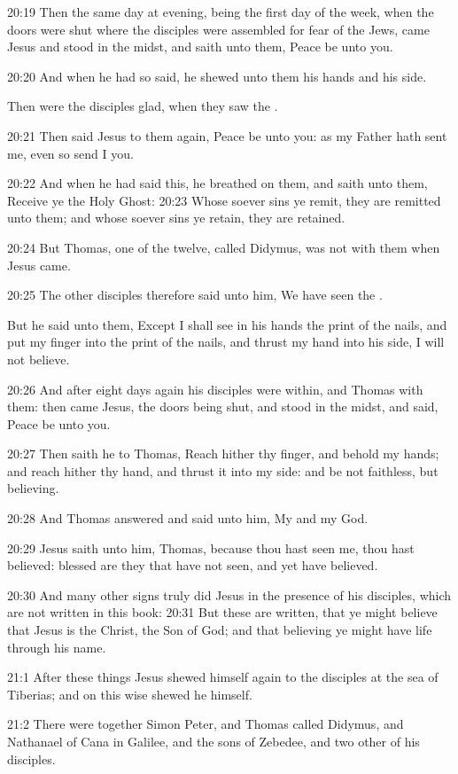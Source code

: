 20:19 Then the same day at evening, being the first day of the week,
when the doors were shut where the disciples were assembled for fear
of the Jews, came Jesus and stood in the midst, and saith unto them,
Peace be unto you.

20:20 And when he had so said, he shewed unto them his hands and his
side.

Then were the disciples glad, when they saw the \LORD.

20:21 Then said Jesus to them again, Peace be unto you: as my Father
hath sent me, even so send I you.

20:22 And when he had said this, he breathed on them, and saith unto
them, Receive ye the Holy Ghost: 20:23 Whose soever sins ye remit,
they are remitted unto them; and whose soever sins ye retain, they are
retained.

20:24 But Thomas, one of the twelve, called Didymus, was not with them
when Jesus came.

20:25 The other disciples therefore said unto him, We have seen the
\LORD.

But he said unto them, Except I shall see in his hands the print of
the nails, and put my finger into the print of the nails, and thrust
my hand into his side, I will not believe.

20:26 And after eight days again his disciples were within, and Thomas
with them: then came Jesus, the doors being shut, and stood in the
midst, and said, Peace be unto you.

20:27 Then saith he to Thomas, Reach hither thy finger, and behold my
hands; and reach hither thy hand, and thrust it into my side: and be
not faithless, but believing.

20:28 And Thomas answered and said unto him, My \LORD and my God.

20:29 Jesus saith unto him, Thomas, because thou hast seen me, thou
hast believed: blessed are they that have not seen, and yet have
believed.

20:30 And many other signs truly did Jesus in the presence of his
disciples, which are not written in this book: 20:31 But these are
written, that ye might believe that Jesus is the Christ, the Son of
God; and that believing ye might have life through his name.

21:1 After these things Jesus shewed himself again to the disciples at
the sea of Tiberias; and on this wise shewed he himself.

21:2 There were together Simon Peter, and Thomas called Didymus, and
Nathanael of Cana in Galilee, and the sons of Zebedee, and two other
of his disciples.

